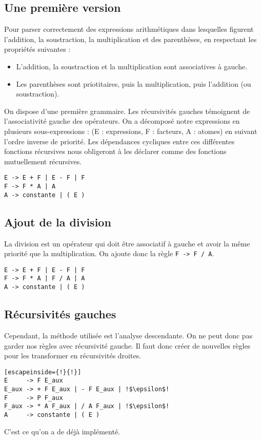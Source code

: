 \documentclass[11pt]{article}
\begin{document}
\subsection{Une première version}
Pour parser correctement des expressions arithmétiques dans lesquelles figurent l'addition, la soustraction, la multiplication et des parenthèses, en respectant les propriétés suivantes :
\begin{itemize}
\item L'addition, la soustraction et la multiplication sont associatives à gauche.
\item Les parenthèses sont priotitaires, puis la multiplication, puis l'addition (ou soustraction).
\end{itemize}

On dispose d'une première grammaire. Les récursivités gauches témoignent de l'associativité gauche des opérateurs. On a décomposé notre expressions en plusieurs sous-expressions : (E : expressions, F : facteurs, A : atomes) en suivant l'ordre inverse de priorité. Les dépendances cycliques entre ces différentes fonctions récursives nous obligeront à les déclarer comme des fonctions mutuellement récursives.

\begin{lstlisting}
E -> E + F | E - F | F
F -> F * A | A
A -> constante | ( E )
\end{lstlisting}

\subsection{Ajout de la division}
La division est un opérateur qui doit être associatif à gauche et avoir la même priorité que la multiplication. On ajoute donc la règle \texttt{F -> F / A}.
\begin{lstlisting}
E -> E + F | E - F | F
F -> F * A | F / A | A
A -> constante | ( E )
\end{lstlisting}

\subsection{Récursivités gauches}
Cependant, la méthode utilisée est l'analyse descendante. On ne peut donc pas garder nos règles avec récursivité gauche. Il faut donc créer de nouvelles règles pour les transformer en récursivités droites.

\begin{lstlisting}[escapeinside={!}{!}]
E     -> F E_aux
E_aux -> + F E_aux | - F E_aux | !$\epsilon$!
F     -> P F_aux
F_aux -> * A F_aux | / A F_aux | !$\epsilon$!
A     -> constante | ( E )
\end{lstlisting}
C'est ce qu'on a de déjà implémenté.
\end{document}
